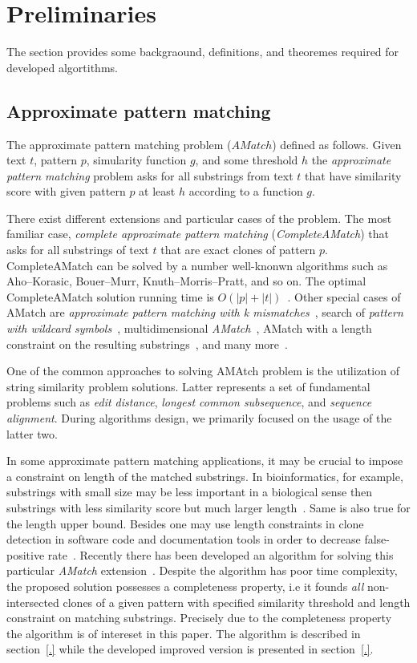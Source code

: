 \section{Preliminaries}
\label{section:preliminaries}

The section provides some backgraound, definitions, and theoremes required for
developed algortithms.

\subsection{Approximate pattern matching}
The approximate pattern matching problem ($AMatch$) defined as follows.
Given text $t$, pattern $p$, simularity function $g$, and some threshold $h$ the \emph{approximate pattern matching} problem asks for all substrings from text $t$ that have similarity score  with given pattern $p$ at least $h$ according to a function $g$.  

There exist different extensions and particular cases of the problem.
The most familiar case, \emph{complete approximate pattern matching} (\emph{CompleteAMatch}) that asks for all substrings of text $t$ that are exact clones of pattern $p$.
CompleteAMatch can be solved by a number well-knonwn algorithms such as Aho--Korasic, Bouer--Murr, Knuth--Morris--Pratt, and so on.
The optimal CompleteAMatch solution running time is $O(|p|+|t|)$~\cite{.}.
Other special cases of AMatch are \emph{approximate pattern matching with k mismatches}~\cite{.}, search of \emph{pattern with wildcard symbols}~\cite{.}, multidimensional \emph{AMatch}~\cite{.}, AMatch with a length constraint on the resulting substrings~\cite{.}, and many more~\cite{.}.

One of the common approaches to solving AMAtch problem is the utilization of string similarity problem solutions.
Latter represents a set of fundamental problems such as \emph{edit distance}, \emph{longest common subsequence}, and \emph{sequence alignment}.
During algorithms design, we primarily focused on the usage of the latter two.

In some approximate pattern matching applications, it may be crucial to impose a constraint on length of the matched substrings.
In bioinformatics, for example, substrings with small size may be less important in a biological sense then substrings with less similarity score but much larger length~\cite{.}.
Same is also true for the length upper bound.
Besides one may use length constraints in clone detection in software code and documentation tools in order to decrease false-positive rate~\cite{.}.
Recently there has been developed an algorithm for solving this particular \emph{AMatch} extension~\cite{.}.
Despite the algorithm has poor time complexity, the proposed solution possesses a completeness property, i.e it founds \emph{all} non-intersected clones of a given pattern with specified similarity threshold and length constraint on matching substrings.
Precisely due to the completeness property the algorithm is of intereset in this paper.
The algorithm is described in section~\ref{.} while the developed improved version is presented in section~\ref{.}.

